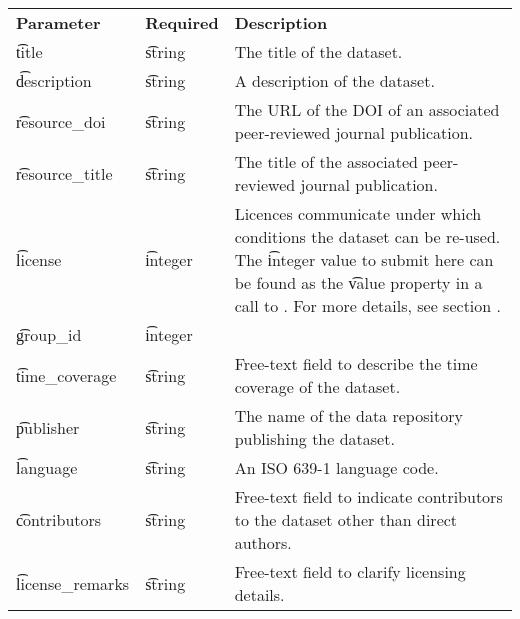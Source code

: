 \begin{tabularx}{\textwidth}{*{2}{!{\VRule[-1pt]}l}!{\VRule[-1pt]}X}
  \headrow
  \textbf{Parameter}   & \textbf{Required} & \textbf{Description}\\
  \t{title}          & \t{string}           & The title of the dataset.\\
  \t{description}    & \t{string}           & A description of the dataset.\\
  \t{resource\_doi}  & \t{string}           & The URL of the DOI of an
                                              associated peer-reviewed
                                              journal publication.\\
  \t{resource\_title} & \t{string}          & The title of the associated
                                              peer-reviewed journal
                                              publication.\\
  \t{license}        & \t{integer}          & Licences communicate under which
                                              conditions the dataset can be
                                              re-used.  The \t{integer} value
                                              to submit here can be found as
                                              the \t{value} property in a call
                                              to . For more
                                              details, see section
                                              .\\
  \t{group\_id}      & \t{integer}          & \\
  \t{time\_coverage} & \t{string}           & Free-text field to describe the
                                              time coverage of the dataset.\\
  \t{publisher}      & \t{string}           & The name of the data repository
                                              publishing the dataset.\\
  \t{language}       & \t{string}           & An ISO 639-1 language code.\\
  \t{contributors}   & \t{string}           & Free-text field to indicate
                                              contributors to the dataset
                                              other than direct authors.\\
  \t{license\_remarks} & \t{string}         & Free-text field to clarify
                                              licensing details.\\

\end{tabularx}

